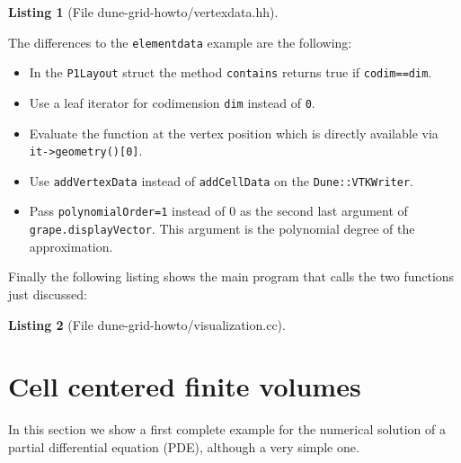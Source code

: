 \documentclass[11pt,a4paper,headinclude,footinclude,DIV16,headings=normal]{scrreprt}
\newtheorem{lst}{Listing}
\begin{document}
\begin{lst}[File dune-grid-howto/vertexdata.hh] \mbox{}
\nopagebreak

\end{lst}

The differences to the \lstinline!elementdata! example are the
following:
\begin{itemize}
\item In the \lstinline!P1Layout! struct the method
  \lstinline!contains! returns true if \lstinline!codim==dim!.
\item Use a leaf iterator for codimension \lstinline!dim! instead of
  \lstinline!0!.
\item Evaluate the function at the vertex position which is directly
  available via \lstinline!it->geometry()[0]!.
\item Use \lstinline!addVertexData! instead of \lstinline!addCellData!
  on the \lstinline!Dune::VTKWriter!.
\item Pass \lstinline!polynomialOrder=1! instead of 0 as
the second last argument of \lstinline!grape.displayVector!. This argument is the polynomial
  degree of the approximation.
\end{itemize}

Finally the following listing shows the main program that calls the
two functions just discussed:

\begin{lst}[File dune-grid-howto/visualization.cc] \mbox{}
\nopagebreak

\end{lst}

\section{Cell centered finite volumes}
\label{Sec:CellCenteredFV}

In this section we show a first complete example for the numerical
solution of a partial differential equation (PDE), although a very simple
one.
\end{document}

